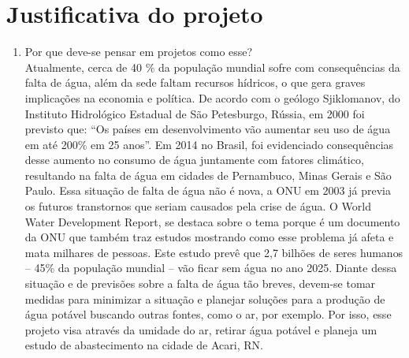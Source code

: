 \section*{Justificativa do projeto}
 \begin{enumerate}[label=\Alph*]
\item Por que deve-se pensar em projetos como esse?\\
Atualmente, cerca de 40 \% da população mundial sofre com consequências da falta de água, além da sede faltam recursos hídricos, o que gera graves implicações na economia e política. De acordo com o geólogo Sjiklomanov, do Instituto Hidrológico Estadual de São Petesburgo, Rússia, em 2000 foi previsto que: “Os países em desenvolvimento vão aumentar seu uso de água em até 200\% em 25 anos”. Em 2014 no Brasil, foi evidenciado consequências desse aumento no consumo de água juntamente com fatores climático, resultando na falta de água em cidades de Pernambuco, Minas Gerais e São Paulo.
Essa situação de falta de água não é nova, a ONU em 2003 já previa os futuros transtornos que seriam causados pela crise de água. O World Water Development Report, se destaca sobre o tema porque é um documento da ONU que também traz estudos mostrando como esse problema já afeta e mata milhares de pessoas. Este estudo prevê que 2,7 bilhões de seres humanos – 45\% da população mundial – vão ficar sem água no ano 2025.
Diante dessa situação e de previsões sobre a falta de água tão breves, devem-se tomar medidas para minimizar a situação e planejar soluções para a produção de água potável buscando outras fontes, como o ar, por exemplo. Por isso, esse projeto visa através da umidade do ar, retirar água potável e planeja um estudo de abastecimento na cidade de Acari, RN.


\end{enumerate}
